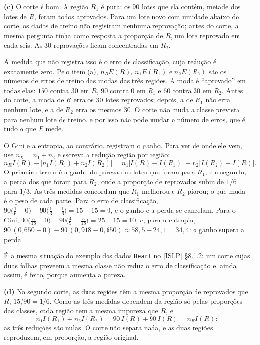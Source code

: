\documentclass[11pt,a4paper]{article}
\begin{document}
\begin{solucao}
\smallskip
\textbf{(c)} O corte é bom. A região $R_1$ é pura: os $90$ lotes que ela contém, metade
dos lotes de $R$, foram todos aprovados. Para um lote novo com umidade abaixo do corte,
os dados de treino não registram nenhuma reprovação; antes do corte, a mesma pergunta
tinha como resposta a proporção de $R$, um lote reprovado em cada seis. As $30$
reprovações ficam concentradas em $R_2$.

A medida que não registra isso é o erro de classificação, cuja redução é exatamente
zero. Pelo item (a), $n_RE(R)$, $n_1E(R_1)$ e $n_2E(R_2)$ são os números de erros de
treino das modas das três regiões. A moda é ``aprovado'' em todas elas: $150$ contra
$30$ em $R$, $90$ contra $0$ em $R_1$ e $60$ contra $30$ em $R_2$. Antes do corte, a
moda de $R$ erra os $30$ lotes reprovados; depois, a de $R_1$ não erra nenhum lote, e a
de $R_2$ erra os mesmos $30$. O corte não muda a classe prevista para nenhum lote de
treino, e por isso não pode mudar o número de erros, que é tudo o que $E$ mede.

O Gini e a entropia, ao contrário, registram o ganho. Para ver de onde ele vem, use
$n_R=n_1+n_2$ e escreva a redução região por região:
\[
  n_RI(R)-\big[n_1I(R_1)+n_2I(R_2)\big]
  =n_1\big[I(R)-I(R_1)\big]-n_2\big[I(R_2)-I(R)\big].
\]
O primeiro termo é o ganho de pureza dos lotes que foram para $R_1$, e o segundo, a
perda dos que foram para $R_2$, onde a proporção de reprovados subiu de $1/6$ para
$1/3$. As três medidas concordam que $R_1$ melhorou e $R_2$ piorou; o que muda é o peso
de cada parte. Para o erro de classificação,
$90\big(\tfrac16-0\big)-90\big(\tfrac13-\tfrac16\big)=15-15=0$, e o ganho e a perda se
cancelam. Para o Gini, $90\big(\tfrac5{18}-0\big)-90\big(\tfrac49-\tfrac5{18}\big)=25-15=10$,
e, para a entropia, $90\,(0{,}650-0)-90\,(0{,}918-0{,}650)\approx58{,}5-24{,}1=34{,}4$:
o ganho supera a perda.

É a mesma situação do exemplo dos dados \texttt{Heart} no [ISLP] §8.1.2: um corte cujas
duas folhas preveem a mesma classe não reduz o erro de classificação e, ainda assim, é
feito, porque aumenta a pureza.

\smallskip
\textbf{(d)} No segundo corte, as duas regiões têm a mesma proporção de reprovados que
$R$, $15/90=1/6$. Como as três medidas dependem da região só pelas proporções das
classes, cada região tem a mesma impureza que $R$, e
\[
  n_1I(R_1)+n_2I(R_2)=90\,I(R)+90\,I(R)=n_RI(R):
\]
as três reduções são nulas. O corte não separa nada, e as duas regiões reproduzem, em
proporção, a região original.


\end{solucao}
\end{document}

